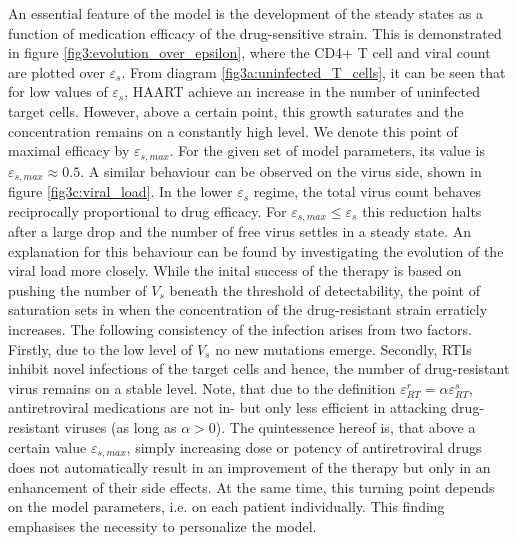 An essential feature of the model is the development of the steady states as a function of medication efficacy of the drug-sensitive strain.
This is demonstrated in figure \ref{fig3:evolution_over_epsilon}, where the CD4+ T cell and viral count are plotted over $\varepsilon_s$.
From diagram \ref{fig3a:uninfected_T_cells}, it can be seen that for low values of $\varepsilon_s$, HAART achieve an increase in the 
number of uninfected target cells.
However, above a certain point, this growth saturates and the concentration remains on a constantly high level.
We denote this point of maximal efficacy by $\varepsilon_{s,max}$. 
For the given set of model parameters, its value is $\varepsilon_{s,max} \approx 0.5$.
A similar behaviour can be observed on the virus side, shown in figure \ref{fig3c:viral_load}.
In the lower $\varepsilon_s$ regime, the total virus count behaves reciprocally proportional to drug efficacy.
For $\varepsilon_{s,max} \leq \varepsilon_{s}$ this reduction halts after a large drop and the number of free virus settles in a steady state.\newline
An explanation for this behaviour can be found by investigating the evolution of the viral load more closely.
While the inital success of the therapy is based on pushing the number of $V_s$ beneath the threshold of detectability, 
the point of saturation sets in when the concentration of the drug-resistant strain erraticly increases.
The following consistency of the infection arises from two factors.
Firstly, due to the low level of $V_s$ no new mutations emerge.
Secondly, RTIs inhibit novel infections of the target cells and hence, the number of drug-resistant virus remains on a stable level.
Note, that due to the definition $\varepsilon_{RT}^r = \alpha \varepsilon_{RT}^s$, antiretroviral medications are not in- but only less 
efficient in attacking drug-resistant viruses (as long as $\alpha > 0$).\newline
The quintessence hereof is, that above a certain value $\varepsilon_{s,max}$, simply increasing dose or potency of antiretroviral drugs does not automatically 
result in an improvement of the therapy but only in an enhancement of their side effects.
At the same time, this turning point depends on the model parameters, i.e. on each patient individually.
This finding emphasises the necessity to personalize the model.

